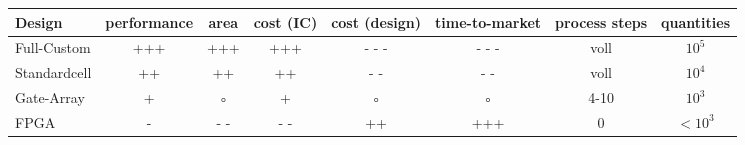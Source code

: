 \begin{table}
  \centering
  \begin{tabular}{l|ccccccc}
    Design       & performance & area & cost (IC) & cost (design) & time-to-market & process steps & quantities \\
    \hline
    Full-Custom  & +++         & +++  & +++       & - - -         & - - -          & voll          & $10^5$     \\
    Standardcell & ++          & ++   & ++        & - -           & - -            & voll          & $10^4$     \\
    Gate-Array   & +           & ◦    & +         & ◦             & ◦              & 4-10          & $10^3$     \\
    FPGA         & -           & - -  & - -       & ++            & +++            & 0             & $<10^3$    \\
  \end{tabular}
\end{table}